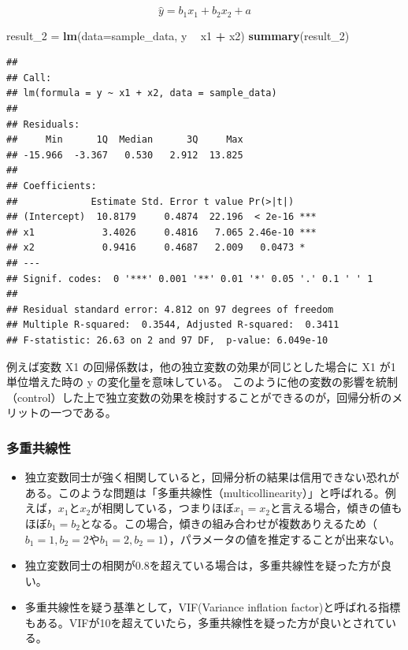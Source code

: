 \documentclass[]{article}
\newenvironment{Shaded}{\begin{snugshade}}{\end{snugshade}}
\newcommand{\KeywordTok}[1]{\textcolor[rgb]{0.13,0.29,0.53}{\textbf{#1}}}
\newcommand{\DataTypeTok}[1]{\textcolor[rgb]{0.13,0.29,0.53}{#1}}
\newcommand{\DecValTok}[1]{\textcolor[rgb]{0.00,0.00,0.81}{#1}}
\newcommand{\StringTok}[1]{\textcolor[rgb]{0.31,0.60,0.02}{#1}}
\newcommand{\OperatorTok}[1]{\textcolor[rgb]{0.81,0.36,0.00}{\textbf{#1}}}
\newcommand{\NormalTok}[1]{#1}
\begin{document}
\[
\hat{y} = b_{1}x_{1}+b_{2}x_{2} + a
\]

\begin{Shaded}
\begin{Highlighting}[]
\NormalTok{result_}\DecValTok{2}\NormalTok{ =}\StringTok{ }\KeywordTok{lm}\NormalTok{(}\DataTypeTok{data=}\NormalTok{sample_data, y }\OperatorTok{~}\StringTok{ }\NormalTok{x1 }\OperatorTok{+}\StringTok{ }\NormalTok{x2)}
\KeywordTok{summary}\NormalTok{(result_}\DecValTok{2}\NormalTok{)}
\end{Highlighting}
\end{Shaded}

\begin{verbatim}
## 
## Call:
## lm(formula = y ~ x1 + x2, data = sample_data)
## 
## Residuals:
##     Min      1Q  Median      3Q     Max 
## -15.966  -3.367   0.530   2.912  13.825 
## 
## Coefficients:
##             Estimate Std. Error t value Pr(>|t|)    
## (Intercept)  10.8179     0.4874  22.196  < 2e-16 ***
## x1            3.4026     0.4816   7.065 2.46e-10 ***
## x2            0.9416     0.4687   2.009   0.0473 *  
## ---
## Signif. codes:  0 '***' 0.001 '**' 0.01 '*' 0.05 '.' 0.1 ' ' 1
## 
## Residual standard error: 4.812 on 97 degrees of freedom
## Multiple R-squared:  0.3544, Adjusted R-squared:  0.3411 
## F-statistic: 26.63 on 2 and 97 DF,  p-value: 6.049e-10
\end{verbatim}

例えば変数 X1 の回帰係数は，他の独立変数の効果が同じとした場合に X1
が1単位増えた時の y の変化量を意味している。
このように他の変数の影響を統制（control）した上で独立変数の効果を検討することができるのが，回帰分析のメリットの一つである。

\subsubsection{多重共線性}

\begin{itemize}
\item
  独立変数同士が強く相関していると，回帰分析の結果は信用できない恐れがある。このような問題は「多重共線性（multicollinearity）」と呼ばれる。例えば，\(x_{1}\)と\(x_{2}\)が相関している，つまりほぼ\(x_{1}=x_{2}\)と言える場合，傾きの値もほぼ\(b_{1}=b_{2}\)となる。この場合，傾きの組み合わせが複数ありえるため（\(b_{1}=1, b_{2}=2\)や\(b_{1}=2, b_{2}=1\)），パラメータの値を推定することが出来ない。
\item
  独立変数同士の相関が0.8を超えている場合は，多重共線性を疑った方が良い。\\
\item
  多重共線性を疑う基準として，VIF(Variance inflation
  factor)と呼ばれる指標もある。VIFが10を超えていたら，多重共線性を疑った方が良いとされている。
\end{itemize}
\end{document}
